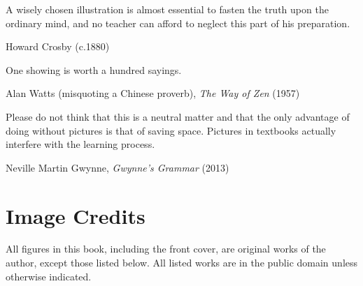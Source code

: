 \epigraph{A wisely chosen illustration is almost essential to fasten the truth upon the ordinary mind, and no teacher can afford to neglect this part of his preparation.}{Howard Crosby (c.1880)}

\epigraph{One showing is worth a hundred sayings.}{Alan Watts (misquoting a Chinese proverb), \textit{The Way of Zen} (1957)}

\epigraph{Please do not think that this is a neutral matter and that the only advantage of doing without pictures is that of saving space. Pictures in textbooks actually interfere with the learning process.}{Neville Martin Gwynne, \textit{Gwynne’s Grammar} (2013)}

\chapter*{Image Credits}

All figures in this book, including the front cover, are original works of the author, except those listed below.
All listed works are in the public domain unless otherwise indicated.


